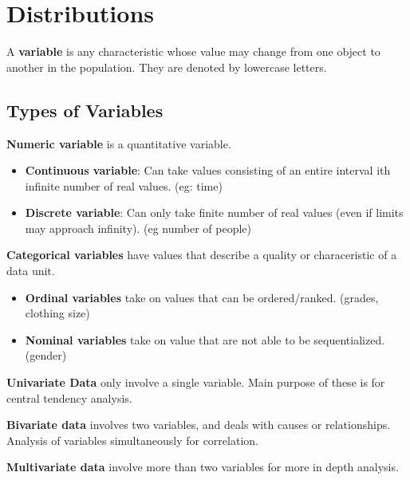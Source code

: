 \documentclass[english, 12pt]{article}
\begin{document}
\section{Distributions}

\begin{defn}
A \textbf{variable} is any characteristic whose value may change from one object to another in the population. They are denoted by lowercase letters.
\end{defn}
\subsection*{Types of Variables}

\begin{defn}
\textbf{Numeric variable} is a quantitative variable.
\begin{itemize}
\item \textbf{Continuous variable}: Can take values consisting of an entire interval ith infinite number of real values. (eg: time)
\item \textbf{Discrete variable}: Can only take finite number of real values (even if limits may approach infinity). (eg number of people)
\end{itemize}
\end{defn}

\begin{defn}
\textbf{Categorical variables} have values that describe a quality or characeristic of a data unit.
\begin{itemize}
\item \textbf{Ordinal variables} take on values that can be ordered/ranked. (grades, clothing size)
\item \textbf{Nominal variables} take on value that are not able to be sequentialized. (gender)
\end{itemize}
\end{defn}

\begin{defn}
\textbf{Univariate Data} only involve a single variable. Main purpose of these is for central tendency analysis.
\end{defn}

\begin{defn}
\textbf{Bivariate data} involves two variables, and deals with causes or relationships. Analysis of variables simultaneously for correlation.
\end{defn}

\begin{defn}
\textbf{Multivariate data} involve more than two variables for more in depth analysis.
\end{defn}
\end{document}
